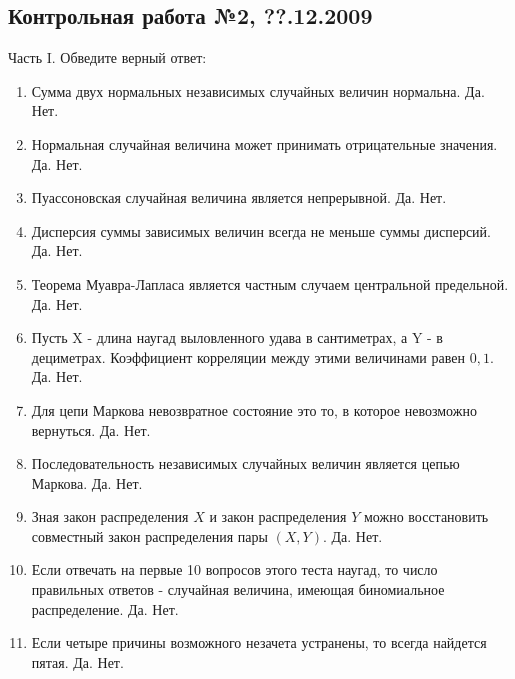 \documentclass[12pt, a4paper]{article}\usepackage[]{graphicx}\usepackage[]{color}
\begin{document}
	\subsection{Контрольная работа №2, ??.12.2009}

	Часть I. Обведите верный ответ:
	\begin{enumerate}
		\item Сумма двух нормальных независимых случайных величин нормальна. Да. Нет.

		\item Нормальная случайная величина может принимать отрицательные значения. Да. Нет.

		\item Пуассоновская случайная величина является непрерывной. Да. Нет.

		\item Дисперсия суммы зависимых величин всегда не меньше суммы дисперсий. Да. Нет.

		\item Теорема Муавра-Лапласа является частным случаем центральной предельной. Да. Нет.

		\item Пусть X - длина наугад выловленного удава в сантиметрах, а Y - в дециметрах. Коэффициент корреляции между этими величинами равен $0,1$. Да. Нет.

		\item Для цепи Маркова невозвратное состояние это то, в которое невозможно вернуться. Да. Нет.

		\item Последовательность  независимых случайных величин является цепью Маркова. Да. Нет.

		\item Зная закон распределения $X$ и закон распределения $Y$ можно восстановить совместный
		закон распределения пары $(X,Y)$. Да. Нет.

		\item Если отвечать на первые 10 вопросов этого теста наугад, то число правильных ответов - случайная величина, имеющая биномиальное распределение. Да. Нет.

		\item Если четыре причины возможного незачета устранены, то всегда найдется пятая. Да. Нет.


\end{enumerate}
\end{document}
